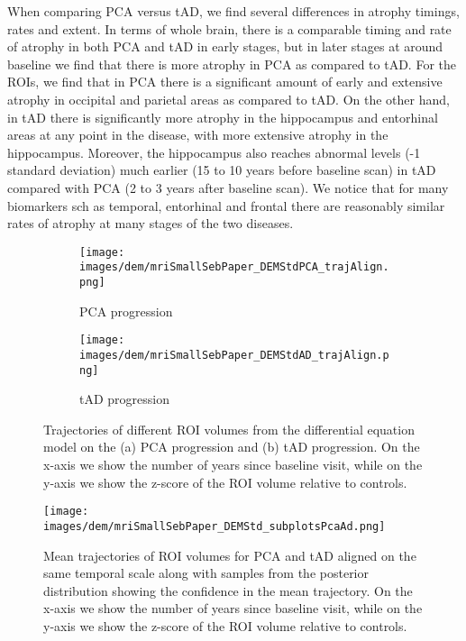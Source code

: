 When comparing PCA versus tAD, we find several differences in atrophy timings, rates and extent. In terms of whole brain, there is a comparable timing and rate of atrophy in both PCA and tAD in early stages, but in later stages at around baseline we find that there is more atrophy in PCA as compared to tAD. For the ROIs, we find that in PCA there is a significant amount of early and extensive atrophy in occipital and parietal areas as compared to tAD. On the other hand, in tAD there is significantly more atrophy in the hippocampus and entorhinal areas at any point in the disease, with more extensive atrophy in the hippocampus. Moreover, the hippocampus also reaches abnormal levels (-1 standard deviation) much earlier (15 to 10 years before baseline scan) in tAD compared with PCA (2 to 3 years after baseline scan). We notice that for many biomarkers sch as temporal, entorhinal and frontal there are reasonably similar rates of atrophy at many stages of the two diseases. 

\begin{figure}
\begin{subfigure}{\textwidth}
 \centering
 \texttt{[image: images/dem/mriSmallSebPaper\_DEMStdPCA\_trajAlign.png]}
 \caption{PCA progression}
 \label{fig:trajDEMPCA}
\end{subfigure}
\begin{subfigure}{\textwidth}
 \centering
 \texttt{[image: images/dem/mriSmallSebPaper\_DEMStdAD\_trajAlign.png]}
 \caption{tAD progression}
  \label{fig:trajDEMAD}
\end{subfigure}
\caption{Trajectories of different ROI volumes from the differential equation model on the (a) PCA progression and (b) tAD progression. On the x-axis we show the number of years since baseline visit, while on the y-axis we show the z-score of the ROI volume relative to controls.}
\label{fig:trajDEM}
\end{figure}

\begin{figure}
 \centering
 \texttt{[image: images/dem/mriSmallSebPaper\_DEMStd\_subplotsPcaAd.png]}
 \caption{Mean trajectories of ROI volumes for PCA and tAD aligned on the same temporal scale along with samples from the posterior distribution showing the confidence in the mean trajectory. On the x-axis we show the number of years since baseline visit, while on the y-axis we show the z-score of the ROI volume relative to controls.}
 \label{trajDEMPcaAd}
\end{figure}

